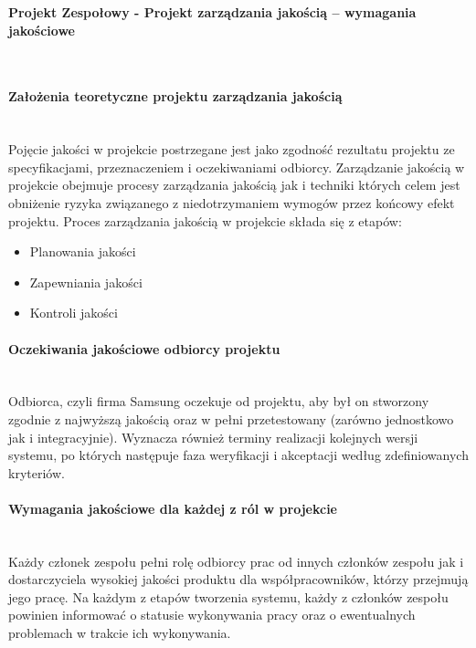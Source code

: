 \documentclass{article}
\begin{document}
\begin{center}
\textbf{Projekt Zespołowy - Projekt zarządzania jakością – wymagania jakościowe}
\end{center}
\mbox{}\\
\paragraph{Założenia teoretyczne projektu zarządzania jakością}\mbox{}\\

Pojęcie jakości w projekcie postrzegane jest jako zgodność rezultatu projektu ze
specyfikacjami, przeznaczeniem i oczekiwaniami odbiorcy.
Zarządzanie jakością w projekcie obejmuje procesy zarządzania jakością jak i techniki których celem jest obniżenie ryzyka związanego z niedotrzymaniem wymogów przez końcowy efekt projektu. Proces zarządzania jakością w projekcie składa się z etapów:
\begin{itemize}
\item Planowania jakości
\item Zapewniania jakości
\item Kontroli jakości
\end{itemize}

\paragraph{Oczekiwania jakościowe odbiorcy projektu}\mbox{}\\

Odbiorca, czyli firma Samsung oczekuje od projektu, aby był on stworzony zgodnie z najwyższą jakością oraz w pełni przetestowany (zarówno jednostkowo jak i integracyjnie). Wyznacza również terminy realizacji kolejnych wersji systemu, po których następuje faza weryfikacji i akceptacji według zdefiniowanych kryteriów.

\paragraph{Wymagania jakościowe dla każdej z ról w projekcie}\mbox{}\\
    
Każdy członek zespołu pełni rolę odbiorcy prac od innych członków zespołu jak i dostarczyciela wysokiej jakości produktu dla współpracowników, którzy przejmują jego pracę. Na każdym z etapów tworzenia systemu, każdy z członków zespołu powinien informować o statusie wykonywania pracy oraz o ewentualnych problemach w trakcie ich wykonywania.
\end{document}
